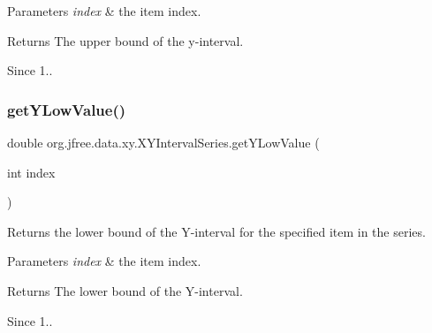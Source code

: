 \begin{DoxyParams}{Parameters}
{\em index} & the item index.\\
\hline
\end{DoxyParams}
\begin{DoxyReturn}{Returns}
The upper bound of the y-\/interval.
\end{DoxyReturn}
\begin{DoxySince}{Since}
1.. 
\end{DoxySince}
\mbox{\label{classorg_1_1jfree_1_1data_1_1xy_1_1_x_y_interval_series_a2bce1a3a6253a0b31d3c08a1af7031b2}} 
\subsubsection{\texorpdfstring{get\+Y\+Low\+Value()}{getYLowValue()}}
{\footnotesize\ttfamily double org.\+jfree.\+data.\+xy.\+X\+Y\+Interval\+Series.\+get\+Y\+Low\+Value (\begin{DoxyParamCaption}\item[{int}]{index }\end{DoxyParamCaption})}

Returns the lower bound of the Y-\/interval for the specified item in the series.


\begin{DoxyParams}{Parameters}
{\em index} & the item index.\\
\hline
\end{DoxyParams}
\begin{DoxyReturn}{Returns}
The lower bound of the Y-\/interval.
\end{DoxyReturn}
\begin{DoxySince}{Since}
1.. 
\end{DoxySince}
\mbox{\label{classorg_1_1jfree_1_1data_1_1xy_1_1_x_y_interval_series_aabd5dda6a780aa76ba4fcc3786ff43af}} 
